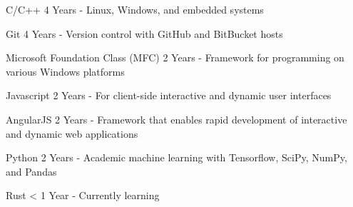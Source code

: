 

\begin{cvskills}
        \cvskill
        {C/C++} %
        {4 Years - Linux, Windows, and embedded systems} %

        \cvskill
        {Git} %
        {4 Years - Version control with GitHub and BitBucket hosts} %

        \cvskill
        {Microsoft Foundation Class (MFC)} %
        {2 Years - Framework for programming on various Windows platforms} %

        \cvskill
        {Javascript} %
        {2 Years - For client-side interactive and dynamic user interfaces} %

        \cvskill
        {AngularJS} %
        {2 Years - Framework that enables rapid development of interactive and dynamic web applications} %

        \cvskill
        {Python} %
        {2 Years - Academic machine learning with Tensorflow, SciPy, NumPy, and Pandas} %

        \cvskill
        {Rust} %
        {< 1 Year - Currently learning} %
\end{cvskills}

